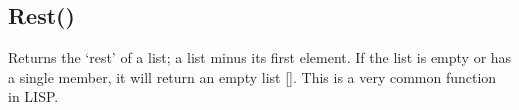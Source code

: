 \documentclass[letterpaper,10pt,english]{sphinxmanual}
\begin{document}
\sphinxAtStartPar
{}

\begin{sphinxVerbatim}[commandchars=\\\{\}]
\end{sphinxVerbatim}

\sphinxAtStartPar
{}

\begin{sphinxVerbatim}[commandchars=\\\{\}]
\PYG{p}{[}\PYG{p}{]}
\PYG{p}{[}\PYG{p}{[}\PYG{p}{]}\PYG{p}{[}\PYG{p}{]}\PYG{p}{[}\PYG{p}{]}\PYG{p}{]}
\end{sphinxVerbatim}

\sphinxAtStartPar
{}

\sphinxAtStartPar
{}

\ignorespaces 

\subsection{Rest()}
\label{\detokenize{reference/design:rest}}\label{\detokenize{reference/design:index-14}}
\sphinxAtStartPar
{}

\sphinxAtStartPar
{}

\sphinxAtStartPar
Returns the ‘rest’ of a list; a list minus its   first element.  If the list is empty or has a single member, it will   return an empty list {[}{]}.  This is a very common function in LISP.

\sphinxAtStartPar
{}
\end{document}
